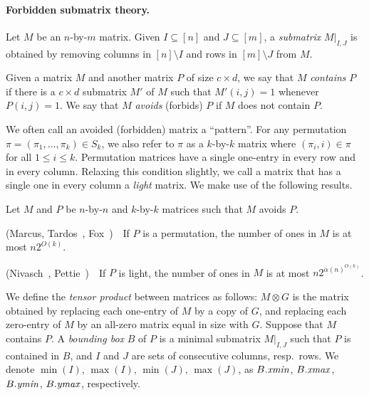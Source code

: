 \paragraph{Forbidden submatrix theory.}

Let $M$ be an $n$-by-$m$ matrix. Given $I \subseteq [n]$ and $J \subseteq [m]$, a \emph{submatrix} $M|_{I,J}$ is obtained by removing columns in $[n] \setminus I$ and rows in $[m] \setminus J$ from $M$.

\begin{definition}
Given a matrix $M$ and another matrix
$P$ of size $c\times d$, we say that $M$ \emph{contains}
$P$ if there is a $c\times d$ submatrix $M'$ of $M$ such that
$M'(i,j)=1$ whenever $P(i,j)=1$. We say that $M$ \emph{avoids} (forbids) $P$ if $M$
does not contain $P$. 
\end{definition}

We often call an avoided (forbidden) matrix a ``pattern''. 
For any permutation $\pi = (\pi_1,\dots,\pi_k) \in S_k$, we also refer to $\pi$ as a $k$-by-$k$ matrix where $(\pi_i,i) \in \pi$ for all $1\le i\le k$. %
Permutation matrices have a single one-entry in every row and in every column. Relaxing this condition slightly, we call a matrix that has a single one in every column a \emph{light} matrix. We make use of the following results.
\begin{lemma}
\label{lem:forbidden}
	Let $M$ and $P$ be $n$-by-$n$ and $k$-by-$k$ matrices such that $M$ avoids $P$.  
	\begin{compactenum}[(i)]
		\item (Marcus, Tardos~\cite{marcus_tardos}, Fox~\cite{jfox})\ \  If $P$ is a permutation, the number
		of ones in $M$ is at most $n2^{O(k)}$.
		\item (Nivasch~\cite{nivasch}, Pettie~\cite{pettie_nonlinear})\ \ If $P$ is light, the number of ones in $M$ is at most $n2^{\alpha(n)^{O(k)}}$.
	\end{compactenum}
\end{lemma}	


We define the \emph{tensor product} between matrices as follows: $M \otimes G$ is the matrix obtained by replacing each one-entry of $M$ by a copy of $G$, and replacing each zero-entry of $M$ by an all-zero matrix equal in size with $G$. Suppose that $M$ contains $P$. A \emph{bounding
box} $B$ of $P$ is a minimal submatrix $M|_{I,J}$ such that $P$ is contained in $B$, and $I$ and $J$ are sets of consecutive columns, resp.\ rows. We denote $\min(I)$, $\max(I)$, $\min(J)$, $\max(J)$, as $B.\mathit{xmin}$, $B.\mathit{xmax}$, $B.\mathit{ymin}$, $B.\mathit{ymax}$, respectively.


